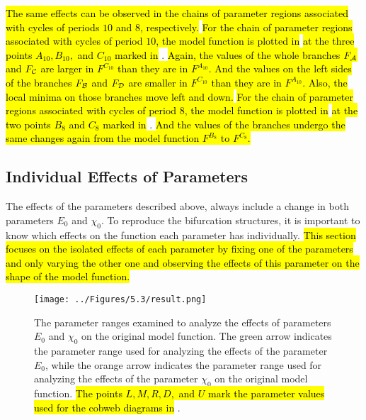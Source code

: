 \hl{
	The same effects can be observed in the chains of parameter regions associated with cycles of periods $10$ and $8$, respectively.
}
\hl{For the chain of parameter regions associated with cycles of period $10$, the model function is plotted in}  \hl{at the three points $A_{10}, B_{10},$ and $C_{10}$ marked in} .
\hl{
	Again, the values of the whole branches $F_{\mathcal{A}}$ and $F_{\mathcal{C}}$ are larger in $F^{C_{10}}$ than they are in $F^{A_{10}}$.
	And the values on the left sides of the branches $F_{\mathcal{B}}$ and $F_{\mathcal{D}}$ are smaller in $F^{C_{10}}$ than they are in $F^{A_{10}}$.
	Also, the local minima on those branches move left and down.
}
\hl{For the chain of parameter regions associated with cycles of period $8$, the model function is plotted in}  \hl{at the two points $B_8$ and $C_8$ marked in} .
\hl{
	And the values of the branches undergo the same changes again from the model function $F^{B_8}$ to $F^{C_8}$.
}

\subsection{Individual Effects of Parameters}
\label{sec:setup.char.paramfx.individual}

The effects of the parameters described above, always include a change in both parameters $E_0$ and $\chi_0$.
To reproduce the bifurcation structures, it is important to know which effects on the function each parameter has individually.
\hl{
	This section focuses on the isolated effects of each parameter by fixing one of the parameters and only varying the other one and observing the effects of this parameter on the shape of the model function.
}

\begin{figure}
	\centering
	\texttt{[image: ../Figures/5.3/result.png]}
	\caption[The parameter ranges examined to analyze the effects of parameters on the original model function]{
		The parameter ranges examined to analyze the effects of parameters $E_0$ and $\chi_0$ on the original model function.
		The green arrow indicates the parameter range used for analyzing the effects of the parameter $E_0$, while the orange arrow indicates the parameter range used for analyzing the effects of the parameter $\chi_0$ on the original model function.
		\hl{The points $L, M, R, D,$ and $U$ mark the parameter values used for the cobweb diagrams in} .
	}
	\label{fig:setup.char.evolution.single.map}
\end{figure}

